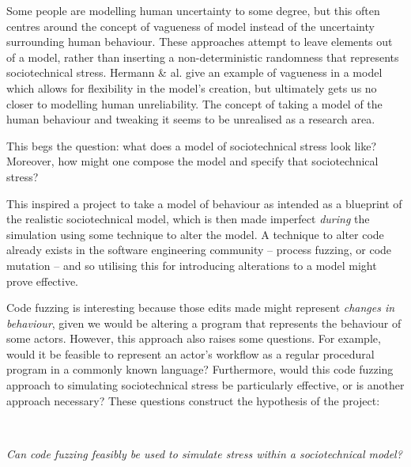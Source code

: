 Some people are modelling human uncertainty to some degree, but this often centres around the concept of vagueness of model instead of the uncertainty surrounding human behaviour. These approaches attempt to leave elements out of a model, rather than inserting a non-deterministic randomness that represents sociotechnical stress. Hermann \& al.\cite{Herrmann1999} give an example of vagueness in a model which allows for flexibility in the model's creation, but ultimately gets us no closer to modelling human unreliability. The concept of taking a model of the human behaviour and tweaking it seems to be unrealised as a research area. \par%

This begs the question: what does a model of sociotechnical stress look like? Moreover, how might one compose the model and specify that sociotechnical stress? \par%

This inspired a project to take a model of behaviour as intended as a blueprint of the realistic sociotechnical model, which is then made imperfect \emph{during} the simulation using some technique to alter the model. A technique to alter code already exists in the software engineering community -- process fuzzing, or code mutation\cite{Miller1988} -- and so utilising this for introducing alterations to a model might prove effective. \par%

Code fuzzing is interesting because those edits made might represent \emph{changes in behaviour}, given we would be altering a program that represents the behaviour of some actors. However, this approach also raises some questions. For example, would it be feasible to represent an actor's workflow as a regular procedural program in a commonly known language? Furthermore, would this code fuzzing approach to simulating sociotechnical stress be particularly effective, or is another approach necessary? These questions construct the hypothesis of the project: \par
\hfill \\

\centerline{\emph{Can code fuzzing feasibly be used to simulate stress within a sociotechnical model?}}
\hfill \\

